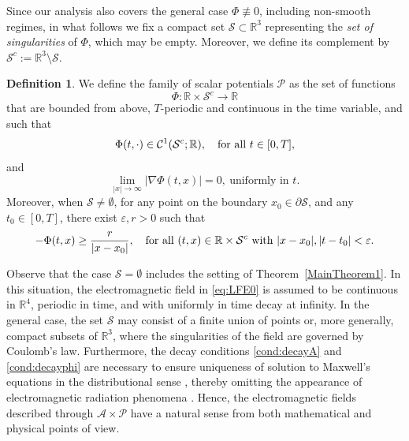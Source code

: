 \documentclass{article}
\newcommand{\boC}{\mathcal{C}}
\newcommand{\R}{\mathbb{R}}
\newcommand{\boA}{\mathcal{A}}
\newcommand{\boP}{\mathcal{P}}
\newcommand{\boS}{\mathcal{S}}
\theoremstyle{definition}
\newtheorem{definition}{Definition}[section]
\begin{document}
Since our analysis also covers the general case $\Phi\not\equiv 0$, including non-smooth regimes, in what follows we fix a compact set $\boS\subset\R^3$ representing the \textsl{set of singularities} of $\Phi$, which may be empty. Moreover, we define its complement by $\boS^c:=\R^3 \setminus \boS$. 
\begin{definition}
	We define the family of scalar potentials $\boP$ as the set of functions $$\Phi:\R\times\boS^c\to\R$$that are bounded from above, $T$-periodic and continuous in the time variable, and such that 
	\begin{equation}
		\Phi(t,\cdot)\in\boC^1(\boS^c;\R),\quad\hbox{for all }t\in[0,T],
	\end{equation} and
	\begin{equation}\label{cond:decayphi}
		\lim_{|x|\to\infty}|\nabla\Phi(t,x)|=0,\ \text{uniformly in }t.
	\end{equation}
	Moreover, when $\boS\neq\emptyset$, for any point on the boundary $x_0\in\partial\boS$, and any $t_0\in[0,T]$, there exist $\varepsilon, r>0$ such that
	\begin{equation}\label{hyp:S}
		-\Phi(t,x)\geq \frac{r}{|x-x_0|},\quad\text{for all }(t,x)\in\R\times\boS^c\hbox{ with } |x-x_0|,|t-t_0|<\varepsilon.
	\end{equation}
\end{definition}
Observe that the case $\boS=\emptyset$ includes the setting of Theorem~\ref{MainTheorem1}. In this situation, the electromagnetic field in \eqref{eq:LFE0} is assumed to be continuous in $\R^4$, periodic in time, and with uniformly in time decay at infinity. In the general case, the set $\boS$ may consist of a finite union of points or, more generally, compact subsets of $\R^3$, where the singularities of the field are governed by Coulomb's law. Furthermore, the decay conditions \eqref{cond:decayA} and \eqref{cond:decayphi} are necessary to ensure uniqueness of solution to Maxwell's equations in the distributional sense \cite{GM,GT2}, thereby omitting the appearance of electromagnetic radiation phenomena \cite{Jac,Gri}. Hence, the electromagnetic fields described through $\boA\times\boP$ have a natural sense from both mathematical and physical points of view. 
 
\end{document}
